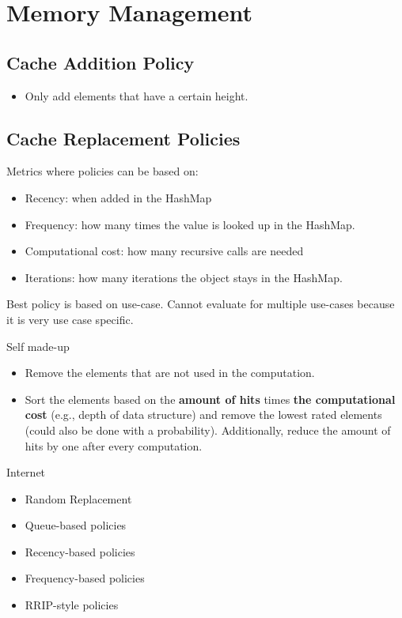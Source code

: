 \section{Memory Management}

\subsection{Cache Addition Policy}


\begin{itemize}
  \item Only add elements that have a certain height.
\end{itemize}

\subsection{Cache Replacement Policies}

Metrics where policies can be based on:
\begin{itemize}
  \item Recency: when added in the HashMap
  \item Frequency: how many times the value is looked up in the HashMap.
  \item Computational cost: how many recursive calls are needed
  \item Iterations: how many iterations the object stays in the HashMap.
\end{itemize}

Best policy is based on use-case. Cannot evaluate for multiple use-cases because it is very use case specific.

Self made-up
\begin{itemize}
  \item Remove the elements that are not used in the computation.
  \item Sort the elements based on the \textbf{amount of hits} times \textbf{the computational cost} (e.g., depth of data structure) and remove the lowest rated elements (could also be done with a probability). Additionally, reduce the amount of hits by one after every computation.
\end{itemize}

Internet
\begin{itemize}
  \item Random Replacement
  \item Queue-based policies
  \item Recency-based policies
  \item Frequency-based policies
  \item RRIP-style policies
\end{itemize}

